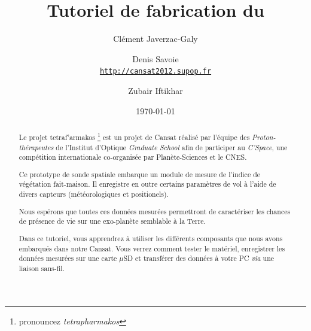 \documentclass[twocolumn, 8pt]{article}
\title{Tutoriel de fabrication du \tet}
\author{Clément Javerzac-Galy \and{Denis Savoie}\\
	\texttt{\url{http://cansat2012.supop.fr}}
\and{Zubair Iftikhar}
}
\date{\today}
\newcommand\tet{\textgreek{tetraf'armakos} }
\begin{document}
\maketitle

\begin{abstract}
    \begin{bfseries}
	    \par \small Le projet \tet \footnote{pronouncez \textit{tetrapharmakos}} est un projet de Cansat réalisé par l'équipe des \textit{Proton-thérapeutes} de l'Institut d'Optique \textit{Graduate School} afin de participer au \textit{C'Space}, une compétition internationale co-organisée par Planète-Sciences et le CNES. 
	    \par \small Ce prototype de sonde spatiale embarque un module de mesure de l'indice de végétation fait-maison. Il enregistre en outre certains paramètres de vol à l'aide de divers capteurs (météorologiques et positionels).
    \par \small Nous espérons que toutes ces données mesurées permettront de caractériser les chances de présence de vie sur une exo-planète semblable à la Terre.
    \par \small Dans ce tutoriel, vous apprendrez à utiliser les différents composants que nous avons embarqués dans notre Cansat. Vous verrez comment tester le matériel, enregistrer les données mesurées sur une carte $\mu$SD et transférer des données à votre PC \textit{via} une liaison sans-fil.
     \end{bfseries}
\end{abstract}
\end{document}
